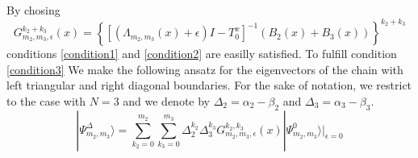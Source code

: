 \documentclass[11pt]{article}
\numberwithin{equation}{section}
\numberwithin{equation}{subsection}
\begin{document}
By chosing 
\begin{equation}
G_{m_{2},m_{3},\epsilon}^{k_{2}+k_{3}}(x)=\left\{\left[\left(\Lambda_{m_{2},m_{3}}(x)+\epsilon\right)I-T_{0}^{x}\right]^{-1}\left(B_{2}(x)+B_{3}(x)\right)\right\}^{k_{2}+k_{3}}
\end{equation}
conditions \eqref{condition1} and \eqref{condition2} are easilly satisfied. To fulfill condition \eqref{condition3}%
We make the following ansatz for the eigenvectors of the chain with left triangular and right diagonal boundaries. For the sake of notation, we restrict to the case with $N=3$ and we denote by $\Delta_{2}=\alpha_{2}-\beta_{2}$ and $\Delta_{3}=\alpha_{3}-\beta_{3}$.
\begin{equation}
|\Psi_{m_{2},m_{3}}^{\Delta}\rangle=\sum_{k_{2}=0}^{m_{2}}\sum_{k_{3}=0}^{m_{3}}\Delta_{2}^{k_{2}}\Delta_{3}^{k_{3}}G_{m_{2},m_{3},\epsilon}^{k_{2},k_{3}}(x)|\Psi_{m_{2},m_{3}}^{0}\rangle|_{\epsilon=0}
\end{equation}
\end{document}
